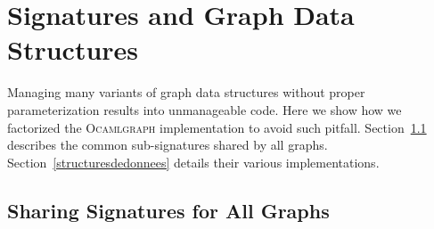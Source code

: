 \documentclass[tfpsymp,pagenumbers]{tfp07symp}
\newcommand{\ocamlgraph}{\textsc{Ocamlgraph}\xspace}
\begin{document}

\section{Signatures and Graph Data Structures}\label{implementation}

Managing many variants of graph data structures without proper
parameterization results into unmanageable code.
%
Here we show how we factorized the \ocamlgraph implementation to avoid
such pitfall.  Section~\ref{interface} describes the common
sub-signatures shared by all graphs. Section~\ref{structuresdedonnees}
details their various implementations.


\subsection{Sharing Signatures for All Graphs}\label{interface}
\end{document}
